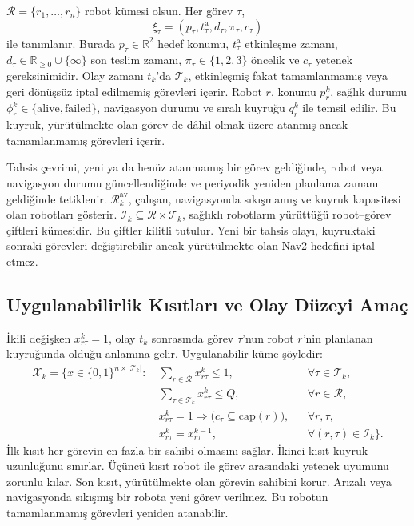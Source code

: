 \documentclass[10pt,letterpaper,onecolumn]{IEEEtran}
\begin{document}
$\mathcal{R}=\{r_1,\ldots,r_n\}$ robot kümesi olsun. Her görev $\tau$,
\[
  \xi_\tau=(p_\tau,t^{\mathrm a}_\tau,d_\tau,\pi_\tau,c_\tau)
\]
ile tanımlanır. Burada $p_\tau\in\mathbb{R}^2$ hedef konumu,
$t^{\mathrm a}_\tau$ etkinleşme zamanı,
$d_\tau\in\mathbb{R}_{\geq0}\cup\{\infty\}$ son teslim zamanı,
$\pi_\tau\in\{1,2,3\}$ öncelik ve $c_\tau$ yetenek gereksinimidir. Olay
zamanı $t_k$'da $\mathcal{T}_k$, etkinleşmiş fakat tamamlanmamış veya geri
dönüşsüz iptal edilmemiş görevleri içerir. Robot $r$, konumu $p_r^k$, sağlık
durumu $\phi_r^k\in\{\mathrm{alive},\mathrm{failed}\}$, navigasyon durumu
ve sıralı kuyruğu $q_r^k$ ile temsil edilir. Bu kuyruk, yürütülmekte olan
görev de dâhil olmak üzere atanmış ancak tamamlanmamış görevleri içerir.

Tahsis çevrimi, yeni ya da henüz atanmamış bir görev geldiğinde, robot veya
navigasyon durumu güncellendiğinde ve periyodik yeniden planlama zamanı
geldiğinde tetiklenir.
$\mathcal{R}^{\mathrm{av}}_k$, çalışan,
navigasyonda sıkışmamış ve kuyruk kapasitesi olan robotları gösterir.
$\mathcal{I}_k\subseteq\mathcal{R}\times\mathcal{T}_k$, sağlıklı robotların
yürüttüğü robot--görev çiftleri kümesidir. Bu çiftler kilitli tutulur. Yeni bir
tahsis olayı, kuyruktaki sonraki görevleri değiştirebilir ancak yürütülmekte
olan Nav2 hedefini iptal etmez.

\subsection{Uygulanabilirlik Kısıtları ve Olay Düzeyi Amaç}

İkili değişken
$x_{r\tau}^k=1$, olay $t_k$ sonrasında görev $\tau$'nun robot $r$'nin
planlanan kuyruğunda olduğu anlamına gelir. Uygulanabilir küme şöyledir:
\begin{align}
  \mathcal{X}_k=\bigl\{x\in\{0,1\}^{n\times|\mathcal{T}_k|}:&
  \ \sum_{r\in\mathcal{R}}x_{r\tau}^k\leq1, &&\forall\tau\in\mathcal{T}_k,\label{eq:single-owner}\\
  &\ \sum_{\tau\in\mathcal{T}_k}x_{r\tau}^k\leq Q, &&\forall r\in\mathcal{R},\label{eq:queue-cap}\\
  &\ x_{r\tau}^k=1\Rightarrow
      \bigl(c_\tau\subseteq\mathrm{cap}(r)\bigr), &&\forall r,\tau,\label{eq:cap-feas}\\
  &\ x_{r\tau}^k=x_{r\tau}^{k-1}, &&\forall(r,\tau)\in\mathcal{I}_k
  \bigr\}.\label{eq:feasible-set}
\end{align}
İlk kısıt her görevin en fazla bir sahibi olmasını sağlar. İkinci kısıt kuyruk
uzunluğunu sınırlar. Üçüncü kısıt robot ile görev arasındaki yetenek uyumunu
zorunlu kılar. Son kısıt, yürütülmekte olan görevin sahibini korur. Arızalı
veya navigasyonda sıkışmış bir robota yeni görev verilmez. Bu robotun
tamamlanmamış görevleri yeniden atanabilir.
\end{document}
